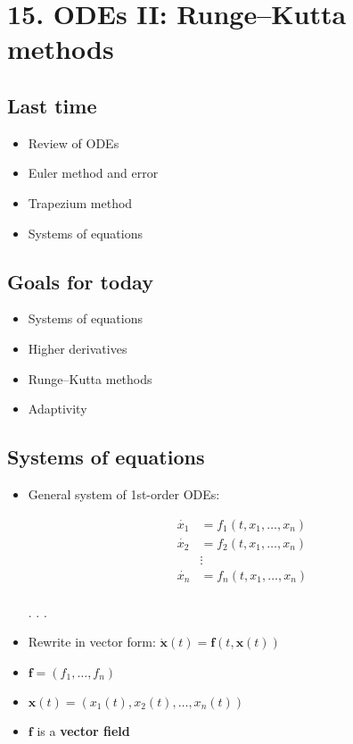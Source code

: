 \documentclass[
]{article}
\date{}
\begin{document}
\hypertarget{odes-ii-rungekutta-methods}{%
\section{15. ODEs II: Runge--Kutta
methods}\label{odes-ii-rungekutta-methods}}

\hypertarget{last-time}{%
\subsection{Last time}\label{last-time}}

\begin{itemize}
\item
  Review of ODEs
\item
  Euler method and error
\item
  Trapezium method
\item
  Systems of equations
\end{itemize}

\hypertarget{goals-for-today}{%
\subsection{Goals for today}\label{goals-for-today}}

\begin{itemize}
\item
  Systems of equations
\item
  Higher derivatives
\item
  Runge--Kutta methods
\item
  Adaptivity
\end{itemize}

\hypertarget{systems-of-equations}{%
\subsection{Systems of equations}\label{systems-of-equations}}

\begin{itemize}
\item
  General system of 1st-order ODEs:

  \begin{align*}
    \dot{x_1} &= f_1(t, x_1, \ldots, x_n) \\
    \dot{x_2} &= f_2(t, x_1, \ldots, x_n) \\
    &\vdots  \\
    \dot{x_n} &= f_n(t, x_1, \ldots, x_n) \\
    \end{align*}

  . . .
\item
  Rewrite in vector form:
  \(\dot{\mathbf{x}}(t) = \mathbf{f}(t, \mathbf{x}(t))\)
\item
  \(\mathbf{f} = (f_1, \ldots, f_n)\)
\item
  \(\mathbf{x}(t) = (x_1(t), x_2(t), \ldots, x_n(t))\)
\item
  \(\mathbf{f}\) is a \textbf{vector field}
\end{itemize}
\end{document}
